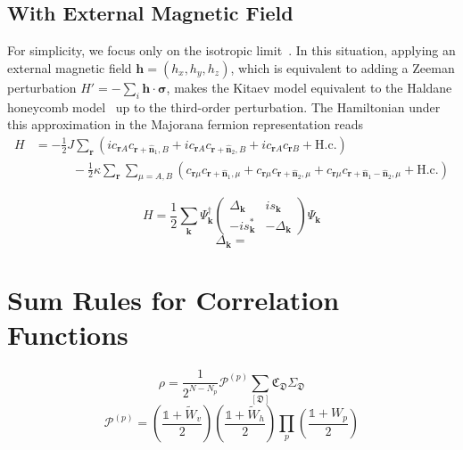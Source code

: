 \documentclass[12font]{article}
\theoremstyle{definition}
\newcommand{\lr}[1]{\left(  #1  \right)}
\newcommand{\mrm}[1]{\mathrm{#1}}
\newcommand{\bo}[1]{\mathbf{#1}}
\newcommand{\bog}[1]{\boldsymbol{#1}}
\begin{document}
\subsection{With External Magnetic Field}
For simplicity, we focus only on the isotropic limit~\cite{Kitaev_2006}. In this situation, applying an external magnetic field $\bo{h} = \lr{h_x,h_y,h_z}$, which is equivalent to adding a Zeeman perturbation $H' = -\sum_{i}\bo{h}\cdot\bog{\sigma}$, makes the Kitaev model equivalent to the Haldane honeycomb model~\cite{Haldane_1988} up to the third-order perturbation. The Hamiltonian under this approximation in the Majorana fermion representation reads
\begin{align*}
    H 
    &= 
    -\frac{1}{2}J\sum_{\bo{r}}
    \lr{
        ic_{\bo{r}A}c_{\bo{r}+\hat{\bo{n}}_1,B} 
        + 
        ic_{\bo{r}A}c_{\bo{r}+\hat{\bo{n}}_2,B}
        +
        ic_{\bo{r}A}c_{\bo{r}B}
        +\mrm{H.c.}
    } \\
    &\quad\quad\quad
    - 
    \frac{1}{2}\kappa
    \sum_{\bo{r}}\sum_{\mu = A,B}
    \lr{
        c_{\bo{r}\mu}c_{\bo{r}+\hat{\bo{n}}_1,\mu}
        +
        c_{\bo{r}\mu}c_{\bo{r}+\hat{\bo{n}}_2,\mu}
        +
        c_{\bo{r}\mu}c_{\bo{r}+\hat{\bo{n}}_1-\hat{\bo{n}}_2,\mu}
        +
        \mrm{H.c.}
    }
\end{align*}

\[
H = 
\frac{1}{2}
\sum_{\bo{k}}
\Psi_{\bo{k}}^\dagger
\begin{pmatrix}
  \Delta_{\bo{k}} & is_{\bo{k}} \\
  -is_{\bo{k}}^* & -\Delta_{\bo{k}}
\end{pmatrix}
\Psi_{\bo{k}}
\]
\[
\Delta_{\bo{k}} = 
\]

\section{Sum Rules for Correlation Functions}

\[
\rho 
= 
\frac{1}{2^{N-N_p}}
\mathcal{P}^{(p)}
\sum_{[\mathfrak{D}]}
\mathfrak{C}_{\mathfrak{D}}
\Sigma_{\mathfrak{D}}
\]
\[
\mathcal{P}^{(p)}
=
\lr{\frac{\mathds{1} + \tilde{W}_v}{2}}
\lr{\frac{\mathds{1} + \tilde{W}_h}{2}}
\prod_{p}\lr{\frac{\mathds{1} + W_p}{2}}
\]
\end{document}
